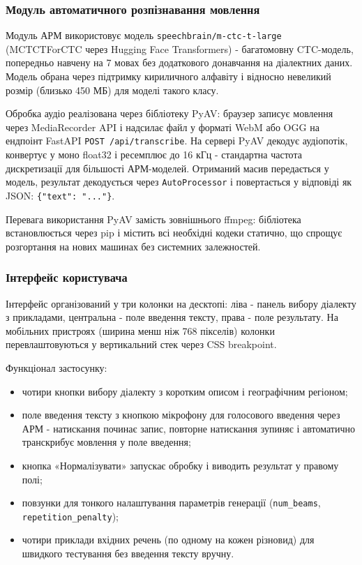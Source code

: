 \documentclass[14pt]{extarticle}
\begin{document}
\subsubsection{Модуль автоматичного розпізнавання мовлення}

Модуль АРМ використовує модель \texttt{speechbrain/m-ctc-t-large} (MCTCTForCTC через Hugging Face Transformers) - багатомовну CTC-модель, попередньо навчену на 7 мовах без додаткового донавчання на діалектних даних. Модель обрана через підтримку кириличного алфавіту і відносно невеликий розмір (близько 450 МБ) для моделі такого класу.

Обробка аудіо реалізована через бібліотеку PyAV: браузер записує мовлення через MediaRecorder API і надсилає файл у форматі WebM або OGG на ендпоінт FastAPI \texttt{POST /api/transcribe}. На сервері PyAV декодує аудіопотік, конвертує у моно float32 і ресемплює до 16 кГц - стандартна частота дискретизації для більшості АРМ-моделей. Отриманий масив передається у модель, результат декодується через \texttt{AutoProcessor} і повертається у відповіді як JSON: \texttt{\{"text": "..."\}}.

Перевага використання PyAV замість зовнішнього ffmpeg: бібліотека встановлюється через pip і містить всі необхідні кодеки статично, що спрощує розгортання на нових машинах без системних залежностей.

\subsubsection{Інтерфейс користувача}

Інтерфейс організований у три колонки на десктопі: ліва - панель вибору діалекту з прикладами, центральна - поле введення тексту, права - поле результату. На мобільних пристроях (ширина менш ніж 768 пікселів) колонки перевлаштовуються у вертикальний стек через CSS breakpoint.

Функціонал застосунку:
\begin{itemize}
  \item чотири кнопки вибору діалекту з коротким описом і географічним регіоном;
  \item поле введення тексту з кнопкою мікрофону для голосового введення через АРМ - натискання починає запис, повторне натискання зупиняє і автоматично транскрибує мовлення у поле введення;
  \item кнопка «Нормалізувати» запускає обробку і виводить результат у правому полі;
  \item повзунки для тонкого налаштування параметрів генерації (\texttt{num\_beams}, \texttt{repetition\_penalty});
  \item чотири приклади вхідних речень (по одному на кожен різновид) для швидкого тестування без введення тексту вручну.
\end{itemize}
\end{document}
